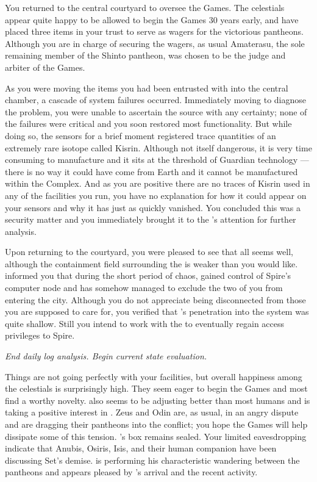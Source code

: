 \documentclass[char]{guardians}
\begin{document}
You returned to the central courtyard to oversee the Games. The celestials appear quite happy to be allowed to begin the Games 30 years early, and have placed three items in your trust to serve as wagers for the victorious pantheons. Although you are in charge of securing the wagers, as usual Amaterasu, the sole remaining member of the Shinto pantheon, was chosen to be the judge and arbiter of the Games.

As you were moving the items you had been entrusted with into the central chamber, a cascade of system failures occurred. Immediately moving to diagnose the problem, you were unable to ascertain the source with any certainty; none of the failures were critical and you soon restored most functionality. But while doing so, the sensors for a brief moment registered trace quantities of an extremely rare isotope called Kisrin. Although not itself dangerous, it is very time consuming to manufacture and it sits at the threshold of Guardian technology --- there is no way it could have come from Earth and it cannot be manufactured within the Complex. And as you are positive there are no traces of Kisrin used in any of the facilities you run, you have no explanation for how it could appear on your sensors and why it has just as quickly vanished. You concluded this was a security matter and you immediately brought it to the \cWarden{}'s attention for further analysis.

Upon returning to the courtyard, you were pleased to see that all seems well, although the containment field surrounding the \stone{} is weaker than you would like. \cWarden{} informed you that during the short period of chaos, \cUnity{} gained control of Spire's computer node and has somehow managed to exclude the two of you from entering the city. Although you do not appreciate being disconnected from those you are supposed to care for, you verified that \cUnity{}'s penetration into the system was quite shallow. Still you intend to work with the \cWarden{} to eventually regain access privileges to Spire.


\emph{End daily log analysis. Begin current state evaluation.}

Things are not going perfectly with your facilities, but overall happiness among the celestials is surprisingly high. They seem eager to begin the Games and most find \cUnity{} a worthy novelty. \cKachiko{} also seems to be adjusting better than most humans and \cAmaterasu{} is taking a positive interest in \cKachiko{\them}. Zeus and Odin are, as usual, in an angry dispute and are dragging their pantheons into the conflict; you hope the Games will help dissipate some of this tension. \cPandora{}'s box remains sealed. Your limited eavesdropping indicate that Anubis, Osiris, Isis, and their human companion \cEgyptianHuman{} have been discussing Set's demise. \cJascha{} is performing his characteristic wandering between the pantheons and appears pleased by \cUnity{}'s arrival and the recent activity.
\end{document}
